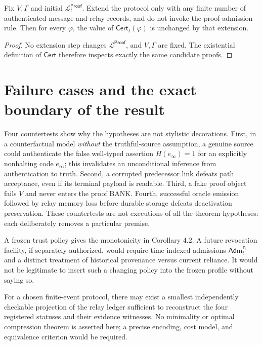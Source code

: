 \documentclass[11pt,letterpaper]{article}
\newcommand{\Cert}{\mathsf{Cert}}\newcommand{\Att}{\mathsf{Att}}\newcommand{\Relay}{\mathsf{Relay}}\newcommand{\Auth}{\mathsf{Auth}}\newcommand{\Trust}{\mathsf{Trusted}}\newcommand{\Adm}{\mathsf{Adm}}\newcommand{\Proof}{\mathsf{Proof}}\newcommand{\Msg}{\mathsf{Msg}}\newcommand{\Log}{\mathcal L}\newcommand{\N}{\mathbb N}
\begin{document}
\begin{proposition}
Fix $V,\Gamma$ and initial $\Log_t^{\Proof}$. Extend the protocol only with any finite number of authenticated message and relay records, and do not invoke the proof-admission rule. Then for every $\varphi$, the value of $\Cert_t(\varphi)$ is unchanged by that extension.
\end{proposition}
\begin{proof}
No extension step changes $\Log^{\Proof}$, and $V,\Gamma$ are fixed. The existential definition of $\Cert$ therefore inspects exactly the same candidate proofs.
\end{proof}

\section{Failure cases and the exact boundary of the result}
Four countertests show why the hypotheses are not stylistic decorations. First, in a counterfactual model \emph{without} the truthful-source assumption, a genuine source could authenticate the false well-typed assertion $H(e_{\infty})=1$ for an explicitly nonhalting code $e_{\infty}$; this invalidates an unconditional inference from authentication to truth. Second, a corrupted predecessor link defeats path acceptance, even if its terminal payload is readable. Third, a fake proof object fails $V$ and never enters the proof BANK. Fourth, successful oracle emission followed by relay memory loss before durable storage defeats deactivation preservation. These countertests are not executions of all the theorem hypotheses: each deliberately removes a particular premise.

A frozen trust policy gives the monotonicity in Corollary 4.2. A future revocation facility, if separately authorized, would require time-indexed admissions $\Adm_t^{\tau_t}$ and a distinct treatment of historical provenance versus current reliance. It would not be legitimate to insert such a changing policy into the frozen profile without saying so.

\begin{conjecture}
For a chosen finite-event protocol, there may exist a smallest independently checkable projection of the relay ledger sufficient to reconstruct the four registered statuses and their evidence witnesses. No minimality or optimal compression theorem is asserted here; a precise encoding, cost model, and equivalence criterion would be required.
\end{conjecture}
\end{document}
